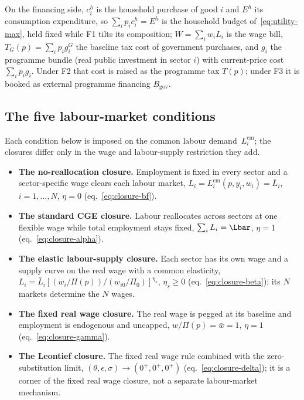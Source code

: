On the financing side, $c_i^h$ is the household purchase of good $i$ and
$E^h$ its consumption expenditure, so $\sum_i p_i c_i^h=E^h$ is the
household budget of~\eqref{eq:utility-max}, held fixed while F1 tilts its
composition; $W=\sum_i w_i L_i$ is the wage bill, $T_G(p)=\sum_i p_i g_i^G$
the baseline tax cost of government purchases, and $g_i$ the programme
bundle (real public investment in sector $i$) with current-price cost
$\sum_i p_i g_i$. Under F2 that cost is raised as the programme tax $T(p)$;
under F3 it is booked as external programme financing $B_{\mathrm{gov}}$.

\subsection{The five labour-market conditions}\label{app:foc-labour}

Each condition below is imposed on the common labour
demand~$L_i^{\mathrm{cm}}$; the closures differ only in the wage and
labour-supply restriction they add.

\begin{itemize}
\item \textbf{The no-reallocation closure.} Employment is fixed in every
  sector and a sector-specific wage clears each labour market,
  $L_i=L_i^{\mathrm{cm}}(p,y_i,w_i)=\bar L_i$, $i=1,\ldots,N$, $\eta=0$
  (eq.~\ref{eq:closure-bf}).
\item \textbf{The standard CGE closure.} Labour reallocates across sectors
  at one flexible wage while total employment stays fixed,
  $\sum_i L_i=\Lbar$, $\eta=1$ (eq.~\ref{eq:closure-alpha}).
\item \textbf{The elastic labour-supply closure.} Each sector has its own
  wage and a supply curve on the real wage with a common elasticity,
  $L_i=\bar L_i[(w_i/\Pi(p))/(w_{i0}/\Pi_0)]^{\eta_s}$, $\eta_s\geq0$
  (eq.~\ref{eq:closure-beta}); its $N$ markets determine the $N$ wages.
\item \textbf{The fixed real wage closure.} The real wage is pegged at its
  baseline and employment is endogenous and uncapped,
  $w/\Pi(p)=\bar w=1$, $\eta=1$ (eq.~\ref{eq:closure-gamma}).
\item \textbf{The Leontief closure.} The fixed real wage rule combined with
  the zero-substitution limit,
  $(\theta,\epsilon,\sigma)\to(0^{+},0^{+},0^{+})$
  (eq.~\ref{eq:closure-delta}); it is a corner of the fixed real wage
  closure, not a separate labour-market mechanism.
\end{itemize}

